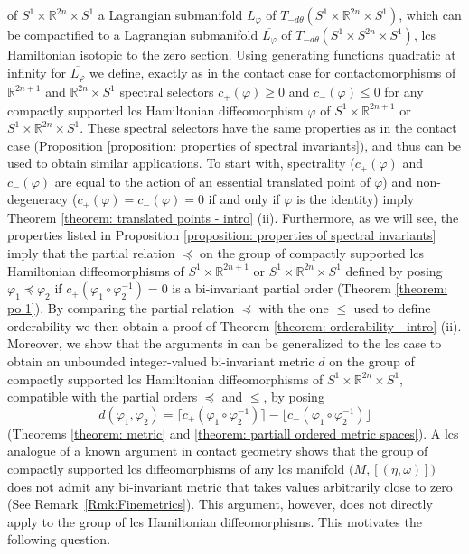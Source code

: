 \documentclass{amsart}
\theoremstyle{remark}
\begin{document}
of $S^1 \times \mathbb{R}^{2n} \times S^1$
a Lagrangian submanifold $L_{\varphi}$ of $T_{-d\theta} (S^1 \times \mathbb{R}^{2n} \times S^1)$,
which can be compactified to a Lagrangian submanifold
$\overline{L_{\varphi}}$ of $T_{-d\theta} (S^1 \times S^{2n} \times S^1)$,
lcs Hamiltonian isotopic to the zero section.
Using generating functions quadratic at infinity for $\overline{L_{\varphi}}$
we define, exactly as in the contact case
for contactomorphisms of $\mathbb{R}^{2n+1}$ and $\mathbb{R}^{2n} \times S^1$
\cite{Bhupal, San11, San10}
spectral selectors $c_+ (\varphi) \geq 0$ and $c_- (\varphi) \leq 0$
for any compactly supported lcs Hamiltonian diffeomorphism
$\varphi$ of $S^1 \times \mathbb{R}^{2n+1}$ or $S^1 \times \mathbb{R}^{2n} \times S^1$.
These spectral selectors have the same properties
as in the contact case
(Proposition \ref{proposition: properties of spectral invariants}),
and thus can be used to obtain similar applications.
To start with,
spectrality 
($c_+ (\varphi)$ and $c_- (\varphi)$ are equal to the action
of an essential translated point of $\varphi$)
and non-degeneracy
($c_+ (\varphi) = c_- (\varphi) = 0$ if and only if $\varphi$ is the identity)
imply Theorem \ref{theorem: translated points - intro} (ii).
Furthermore,
as we will see,
the properties listed in Proposition \ref{proposition: properties of spectral invariants}
imply that the partial relation $\preceq$
on the group of compactly supported lcs Hamiltonian diffeomorphisms
of $S^1 \times \mathbb{R}^{2n+1}$ or $S^1 \times \mathbb{R}^{2n} \times S^1$
defined by posing $\varphi_1 \preceq \varphi_2$
if $c_+ (\varphi_1 \circ \varphi_2^{-1}) = 0$
is a bi-invariant partial order
(Theorem \ref{theorem: po 1}).
By comparing the partial relation $\preceq$
with the one $\leq$ used to define orderability
we then obtain a proof of Theorem \ref{theorem: orderability - intro} (ii).
Moreover,
we show that the arguments in \cite{San11, San10}
can be generalized to the lcs case
to obtain an unbounded integer-valued bi-invariant metric
$d$ on the group of compactly supported lcs Hamiltonian diffeomorphisms
of $S^1 \times \mathbb{R}^{2n} \times S^1$,
compatible with the partial orders $\preceq$ and $\leq$,
by posing 
\[
d (\varphi_1, \varphi_2)
= \lceil c_+ (\varphi_1 \circ \varphi_2^{-1}) \rceil
- \lfloor c_- (\varphi_1 \circ \varphi_2^{-1}) \rfloor
\]
(Theorems \ref{theorem: metric}
and \ref{theorem: partiall ordered metric spaces}).
A lcs analogue of a known argument in contact geometry
shows that the group of compactly supported lcs diffeomorphisms
of any lcs manifold $\big( M , [(\eta, \omega)] \big)$
does not admit any bi-invariant metric
that takes values arbitrarily close to zero
(See Remark~\ref{Rmk:Finemetrics}).
This argument, however, does not directly apply
to the group of lcs Hamiltonian diffeomorphisms.
This motivates the following question.
\end{document}

